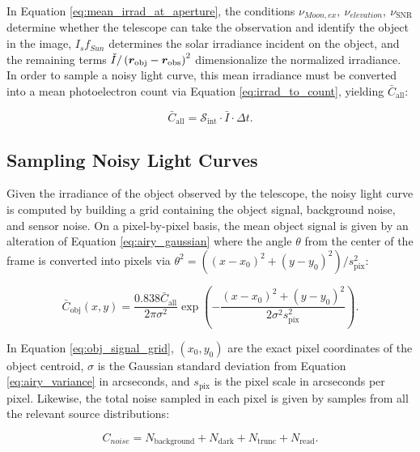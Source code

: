 In Equation \ref{eq:mean_irrad_at_aperture}, the conditions $\nu_{Moon,ex},\: \nu_{elevation},\: \nu_{\mathrm{SNR}}$ determine whether the telescope can take the observation and identify the object in the image, $I_s f_{Sun}$ determines the solar irradiance incident on the object, and the remaining terms $\check{I} / \left( \bm{r}_\mathrm{obj} - \bm{r}_\mathrm{obs} \right)^2$ dimensionalize the normalized irradiance. In order to sample a noisy light curve, this mean irradiance must be converted into a mean photoelectron count via Equation \ref{eq:irrad_to_count}, yielding $\bar{C}_\mathrm{all}$:

\begin{equation}
  \bar{C}_\mathrm{all} = \mathcal{S}_\mathrm{int} \cdot \bar{I} \cdot \Delta t.
\end{equation}

\subsection{Sampling Noisy Light Curves} \label{sec:sampling_lcs}

Given the irradiance of the object observed by the telescope, the noisy light curve is computed by building a grid containing the object signal, background noise, and sensor noise. On a pixel-by-pixel basis, the mean object signal is given by an alteration of Equation \ref{eq:airy_gaussian} where the angle $\theta$ from the center of the frame is converted into pixels via $\theta^2 = \left((x - x_0)^2 + (y - y_0)^2 \right) / s_\mathrm{pix}^2$:

\begin{equation} \label{eq:obj_signal_grid}
  \bar{C}_\mathrm{obj}(x, y) = \frac{0.838 \bar{C}_\mathrm{all}}{2 \pi \sigma^2} \exp\left( - \frac{(x - x_0)^2 + (y - y_0)^2}{2 \sigma^2  s_\mathrm{pix}^2} \right).
\end{equation}

In Equation \ref{eq:obj_signal_grid}, $\left(x_0, y_0\right)$ are the exact pixel coordinates of the object centroid, $\sigma$ is the Gaussian standard deviation from Equation \ref{eq:airy_variance} in arcseconds, and $s_\mathrm{pix}$ is the pixel scale in arcseconds per pixel. Likewise, the total noise sampled in each pixel is given by samples from all the relevant source distributions:

\begin{equation} \label{eq:noise_signal_grid}
  C_{noise} = N_\mathrm{background} + N_\mathrm{dark} + N_\mathrm{trunc} + N_\mathrm{read}.
\end{equation}

